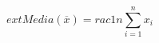 \documentclass[preview]{standalone}
\begin{document}
\begin{center}
\[ 	ext{Media} (\overline{x}) = rac{1}{n} \sum_{i=1}^{n} x_i \]
\end{center}
\end{document}
